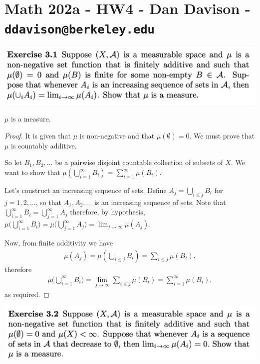 \section*{Math 202a - HW4 - Dan Davison - \texttt{ddavison@berkeley.edu}}
\begin{mdframed}
  \includegraphics[width=400pt]{img/analysis--berkeley-202a-hw04-f604.png}
\end{mdframed}
\begin{claim*}
  $\mu$ is a measure.
\end{claim*}
\begin{proof}
  It is given that $\mu$ is non-negative and that $\mu(\emptyset) = 0$. We must prove that $\mu$ is countably
  additive.

  So let $B_1, B_2, \dots$ be a pairwise disjoint countable collection of subsets of $X$. We want to show
  that $\mu(\bigcup_{i=1}^\infty B_i) = \sum_{i=1}^\infty \mu(B_i)$.

  Let's construct an increasing sequence of sets. Define $A_j = \bigcup_{i \leq j} B_i$ for $j=1, 2, \dots$, so
  that $A_1, A_2, \dots$ is an increasing sequence of sets. Note
  that $\bigcup_{i=1}^\infty B_i = \bigcup_{j=1}^\infty A_j$ therefore, by
  hypothesis,
  $\mu\big(\bigcup_{i=1}^\infty B_i\big) = \mu\big(\bigcup_{j=1}^\infty A_j\big) = \lim_{j\to\infty} \mu(A_j)$.

  Now, from finite additivity we have
  \begin{align*}
    \mu(A_j) = \mu(\bigcup_{i \leq j} B_i) = \sum_{i\leq j} \mu(B_i),
  \end{align*}
  therefore
  \begin{align*}
    \mu\big(\bigcup_{i=1}^\infty B_i\big) = \lim_{j\to\infty} \sum_{i\leq j} \mu(B_i) = \sum_{i=1}^\infty \mu(B_i),
  \end{align*}
  as required.
\end{proof}

\newpage
\begin{mdframed}
\includegraphics[width=400pt]{img/analysis--berkeley-202a-hw04-c187.png}
\end{mdframed}

